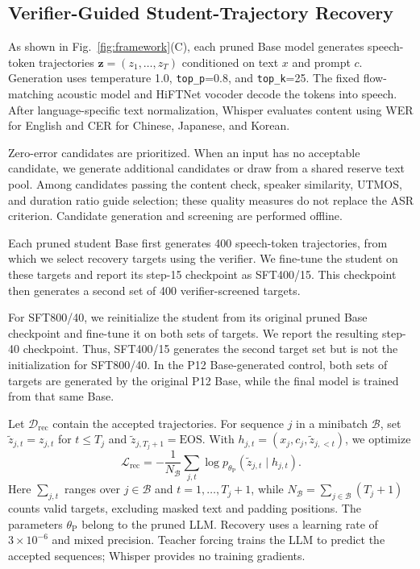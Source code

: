 \documentclass{article}
\begin{document}
\subsection{Verifier-Guided Student-Trajectory Recovery}
\label{sec:verifier_recovery}

As shown in Fig.~\ref{fig:framework}(C), each pruned Base model
generates speech-token trajectories
$\mathbf{z}=(z_1,\ldots,z_T)$ conditioned on text $x$ and prompt $c$.
Generation uses temperature 1.0, \texttt{top\_p}=0.8, and
\texttt{top\_k}=25. The fixed flow-matching acoustic model and
HiFTNet vocoder decode the tokens into speech. After
language-specific text normalization, Whisper evaluates content
using WER for English and CER for Chinese, Japanese, and Korean.

Zero-error candidates are prioritized. When an input has no
acceptable candidate, we generate additional candidates or draw
from a shared reserve text pool. Among candidates passing the
content check, speaker similarity, UTMOS, and duration ratio guide
selection; these quality measures do not replace the ASR criterion.
Candidate generation and screening are performed offline.

Each pruned student Base first generates 400 speech-token
trajectories, from which we select recovery targets using the
verifier. We fine-tune the student on these targets and report
its step-15 checkpoint as SFT400/15. This checkpoint then
generates a second set of 400 verifier-screened targets.

For SFT800/40, we reinitialize the student from its original
pruned Base checkpoint and fine-tune it on both sets of targets.
We report the resulting step-40 checkpoint. Thus, SFT400/15
generates the second target set but is not the initialization
for SFT800/40. In the P12 Base-generated control, both sets
of targets are generated by the original P12 Base, while the
final model is trained from that same Base.

Let $\mathcal{D}_{\mathrm{rec}}$ contain the accepted trajectories.
For sequence $j$ in a minibatch $\mathcal B$, set
$\tilde z_{j,t}=z_{j,t}$ for $t\leq T_j$ and
$\tilde z_{j,T_j+1}=\mathrm{EOS}$. With
$h_{j,t}=(x_j,c_j,\tilde z_{j,<t})$, we optimize
\begin{equation}
\mathcal{L}_{\mathrm{rec}}
=-\frac{1}{N_{\mathcal B}}\sum_{j,t}
\log p_{\theta_{\mathrm P}}
(\tilde z_{j,t}\mid h_{j,t}).
\label{eq:recovery_loss}
\end{equation}
Here $\sum_{j,t}$ ranges over $j\in\mathcal B$ and
$t=1,\ldots,T_j+1$, while
$N_{\mathcal B}=\sum_{j\in\mathcal B}(T_j+1)$ counts valid targets,
excluding masked text and padding positions. The parameters
$\theta_{\mathrm P}$ belong to the pruned LLM. Recovery uses a
learning rate of $3\times10^{-6}$ and mixed precision. Teacher
forcing trains the LLM to predict the accepted sequences; Whisper
provides no training gradients.
\end{document}
